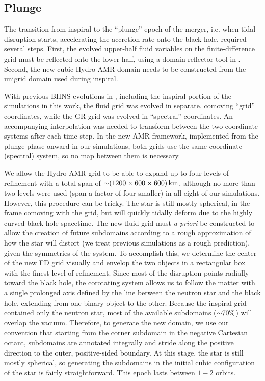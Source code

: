 \subsection{Plunge}  
The transition from inspiral to the ``plunge'' epoch of the merger, i.e. when tidal disruption starts, accelerating the accretion rate onto the black hole, required several steps.  First, the evolved upper-half fluid variables on the finite-difference grid must be reflected onto the lower-half, using a domain reflector tool in \SpEC.  Second, the new cubic Hydro-AMR domain needs to be constructed from the unigrid domain used during inspiral.

With previous BHNS evolutions in \SpEC, including the inspiral portion of the simulations in this work, the fluid grid was evolved in separate, comoving ``grid'' coordinates, while the GR grid was evolved in ``spectral'' coordinates.  An accompanying interpolation was needed to transform between the two coordinate systems after each time step.
In the new AMR framework, implemented from the plunge phase onward in our simulations, both grids use the same coordinate (spectral) system, so no map between them is necessary. 

We allow the Hydro-AMR grid to be able to expand up to four levels of refinement with a total span of $\mathord{\sim}(1200 \times 600 \times 600)\, \textrm{km}$, although no more than two levels were used (span a factor of four smaller) in all eight of our simulations.
However, this procedure can be tricky. 
The star is still mostly spherical, in the frame comoving with the grid, but will quickly tidally deform due to the highly curved black hole spacetime.
The new fluid grid must \textit{a priori} be constructed to allow the creation of future subdomains according to a rough approximation of how the star will distort (we treat previous simulations as a rough prediction), given the symmetries of the system.
To accomplish this, we determine the center of the new FD grid visually and envelop the two objects in a rectangular box with the finest level of refinement.  
Since most of the disruption points radially toward the black hole, the corotating system allows us to follow the matter with a single prolonged axis defined by the line between the neutron star and the black hole, extending from one binary object to the other.
Because the inspiral grid contained only the neutron star, most of the available subdomains ($\mathord{\sim} 70\%$) will overlap the vacuum.  
Therefore, to generate the new domain, we use our convention that starting from the corner subdomain in the negative Cartesian octant, subdomains are annotated integrally and stride along the positive direction to the outer, positive-sided boundary.
At this stage, the star is still mostly spherical, so generating the subdomains in the initial cubic configuration of the star is fairly straightforward.
This epoch lasts between $1 - 2$ orbits.

